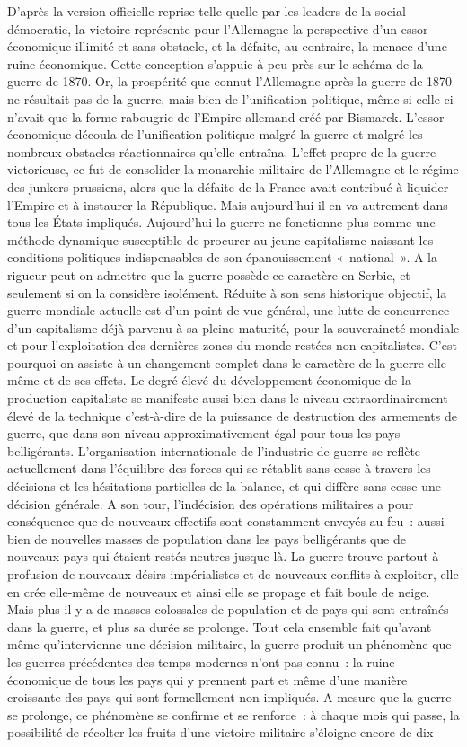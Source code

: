 \documentclass[french,twoside]{book} %
\begin{document}
D'après la version officielle reprise telle quelle par les leaders de la social-démocratie, la victoire représente pour l’Allemagne la perspective d’un essor économique illimité et sans obstacle, et la défaite, au contraire, la menace d’une ruine économique. Cette conception s’appuie à peu près sur le schéma de la guerre de 1870. Or, la prospérité que connut l’Allemagne après la guerre de 1870 ne résultait pas de la guerre, mais bien de l’unification politique, même si celle-ci n’avait que la forme rabougrie de l’Empire allemand créé par Bismarck. L'essor économique découla de l’unification politique malgré la guerre et malgré les nombreux obstacles réactionnaires qu’elle entraîna. L'effet propre de la guerre victorieuse, ce fut de consolider la monarchie militaire de l’Allemagne et le régime des junkers prussiens, alors que la défaite de la France avait contribué à liquider l’Empire et à instaurer la République. Mais aujourd’hui il en va autrement dans tous les États impliqués. Aujourd’hui la guerre ne fonctionne plus comme une méthode dynamique susceptible de procurer au jeune capitalisme naissant les conditions politiques indispensables de son épanouissement « national ». A la rigueur peut-on admettre que la guerre possède ce caractère en Serbie, et seulement si on la considère isolément. Réduite à son sens historique objectif, la guerre mondiale actuelle est d’un point de vue général, une lutte de concurrence d’un capitalisme déjà parvenu à sa pleine maturité, pour la souveraineté mondiale et pour l’exploitation des dernières zones du monde restées non capitalistes. C'est pourquoi on assiste à un changement complet dans le caractère de la guerre elle-même et de ses effets. Le degré élevé du développement économique de la production capitaliste se manifeste aussi bien dans le niveau extraordinairement élevé de la technique c’est-à-dire de la puissance de destruction des armements de guerre, que dans son niveau approximativement égal pour tous les pays belligérants. L'organisation internationale de l’industrie de guerre se reflète actuellement dans l’équilibre des forces qui se rétablit sans cesse à travers les décisions et les hésitations partielles de la balance, et qui diffère sans cesse une décision générale. A son tour, l’indécision des opérations militaires a pour conséquence que de nouveaux effectifs sont constamment envoyés au feu : aussi bien de nouvelles masses de population dans les pays belligérants que de nouveaux pays qui étaient restés neutres jusque-là. La guerre trouve partout à profusion de nouveaux désirs impérialistes et de nouveaux conflits à exploiter, elle en crée elle-même de nouveaux et ainsi elle se propage et fait boule de neige. Mais plus il y a de masses colossales de population et de pays qui sont entraînés dans la guerre, et plus sa durée se prolonge. Tout cela ensemble fait qu’avant même qu’intervienne une décision militaire, la guerre produit un phénomène que les guerres précédentes des temps modernes n’ont pas connu : la ruine économique de tous les pays qui y prennent part et même d’une manière croissante des pays qui sont formellement non impliqués. A mesure que la guerre se prolonge, ce phénomène se confirme et se renforce : à chaque mois qui passe, la possibilité de récolter les fruits d’une victoire militaire s’éloigne encore de dix 
\end{document}
